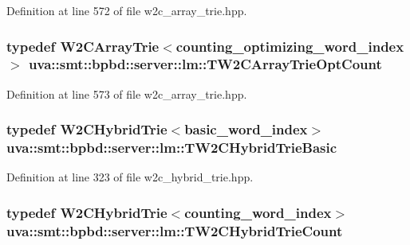 Definition at line 572 of file w2c\+\_\+array\+\_\+trie.\+hpp.

\hypertarget{namespaceuva_1_1smt_1_1bpbd_1_1server_1_1lm_a9b401f3ea6f45b4bea89a9ae00067c64}{}
\subsubsection[{T\+W2\+C\+Array\+Trie\+Opt\+Count}]{\setlength{\rightskip}{0pt plus 5cm}typedef {\bf W2\+C\+Array\+Trie}$<${\bf counting\+\_\+optimizing\+\_\+word\+\_\+index} $>$ {\bf uva\+::smt\+::bpbd\+::server\+::lm\+::\+T\+W2\+C\+Array\+Trie\+Opt\+Count}}\label{namespaceuva_1_1smt_1_1bpbd_1_1server_1_1lm_a9b401f3ea6f45b4bea89a9ae00067c64}


Definition at line 573 of file w2c\+\_\+array\+\_\+trie.\+hpp.

\hypertarget{namespaceuva_1_1smt_1_1bpbd_1_1server_1_1lm_aefd4747976580c022cfcc90fb0d0c359}{}
\subsubsection[{T\+W2\+C\+Hybrid\+Trie\+Basic}]{\setlength{\rightskip}{0pt plus 5cm}typedef {\bf W2\+C\+Hybrid\+Trie}$<${\bf basic\+\_\+word\+\_\+index}$>$ {\bf uva\+::smt\+::bpbd\+::server\+::lm\+::\+T\+W2\+C\+Hybrid\+Trie\+Basic}}\label{namespaceuva_1_1smt_1_1bpbd_1_1server_1_1lm_aefd4747976580c022cfcc90fb0d0c359}


Definition at line 323 of file w2c\+\_\+hybrid\+\_\+trie.\+hpp.

\hypertarget{namespaceuva_1_1smt_1_1bpbd_1_1server_1_1lm_a0e46e4f0c25b1f6e07cbb2854f69beb8}{}
\subsubsection[{T\+W2\+C\+Hybrid\+Trie\+Count}]{\setlength{\rightskip}{0pt plus 5cm}typedef {\bf W2\+C\+Hybrid\+Trie}$<${\bf counting\+\_\+word\+\_\+index}$>$ {\bf uva\+::smt\+::bpbd\+::server\+::lm\+::\+T\+W2\+C\+Hybrid\+Trie\+Count}}\label{namespaceuva_1_1smt_1_1bpbd_1_1server_1_1lm_a0e46e4f0c25b1f6e07cbb2854f69beb8}


